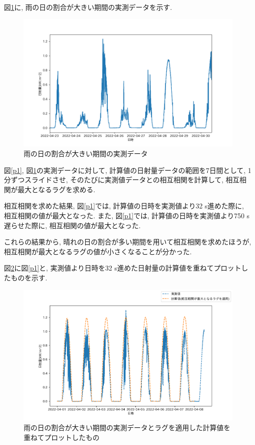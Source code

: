 \documentclass[a4j,12pt,]{jarticle}
\begin{document}
図\ref{p2}に, 雨の日の割合が大きい期間の実測データを示す.

\begin{figure}[H]
  \begin{center}
    \includegraphics[width=160mm]{2.png}
    \caption{雨の日の割合が大きい期間の実測データ}
    \label{p2}
  \end{center}
\end{figure}

図\ref{p1}, 図\ref{p2}の実測データに対して, 計算値の日射量データの範囲を7日間として, 1分ずつスライドさせ, そのたびに実測値データとの相互相関を計算して, 相互相関が最大となるラグを求める.

相互相関を求めた結果, 図\ref{p1}では, 計算値の日時を実測値より32 \si{\second}進めた際に, 相互相関の値が最大となった.
また, 図\ref{p1}では, 計算値の日時を実測値より750 \si{\second}遅らせた際に, 相互相関の値が最大となった.

これらの結果から, 晴れの日の割合が多い期間を用いて相互相関を求めたほうが, 相互相関が最大となるラグの値が小さくなることが分かった.

図\ref{p3}に図\ref{p1}と, 実測値より日時を32 \si{\second}進めた日射量の計算値を重ねてプロットしたものを示す.

\begin{figure}[H]
  \begin{center}
    \includegraphics[width=160mm]{3.png}
    \caption{雨の日の割合が大きい期間の実測データとラグを適用した計算値を重ねてプロットしたもの}
    \label{p3}
  \end{center}
\end{figure}
\end{document}
